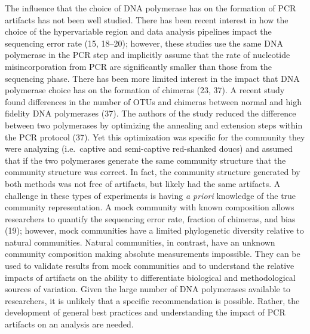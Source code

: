 \documentclass[11pt,]{article}
\begin{document}
The influence that the choice of DNA polymerase has on the formation of
PCR artifacts has not been well studied. There has been recent interest
in how the choice of the hypervariable region and data analysis
pipelines impact the sequencing error rate (15, 18--20); however, these
studies use the same DNA polymerase in the PCR step and implicitly
assume that the rate of nucleotide misincorporation from PCR are
significantly smaller than those from the sequencing phase. There has
been more limited interest in the impact that DNA polymerase choice has
on the formation of chimeras (23, 37). A recent study found differences
in the number of OTUs and chimeras between normal and high fidelity DNA
polymerases (37). The authors of the study reduced the difference
between two polymerases by optimizing the annealing and extension steps
within the PCR protocol (37). Yet this optimization was specific for the
community they were analyzing (i.e.~captive and semi-captive red-shanked
doucs) and assumed that if the two polymerases generate the same
community structure that the community structure was correct. In fact,
the community structure generated by both methods was not free of
artifacts, but likely had the same artifacts. A challenge in these types
of experiments is having \emph{a priori} knowledge of the true community
representation. A mock community with known composition allows
researchers to quantify the sequencing error rate, fraction of chimeras,
and bias (19); however, mock communities have a limited phylogenetic
diversity relative to natural communities. Natural communities, in
contrast, have an unknown community composition making absolute
measurements impossible. They can be used to validate results from mock
communities and to understand the relative impacts of artifacts on the
ability to differentiate biological and methodological sources of
variation. Given the large number of DNA polymerases available to
researchers, it is unlikely that a specific recommendation is possible.
Rather, the development of general best practices and understanding the
impact of PCR artifacts on an analysis are needed.
\end{document}
